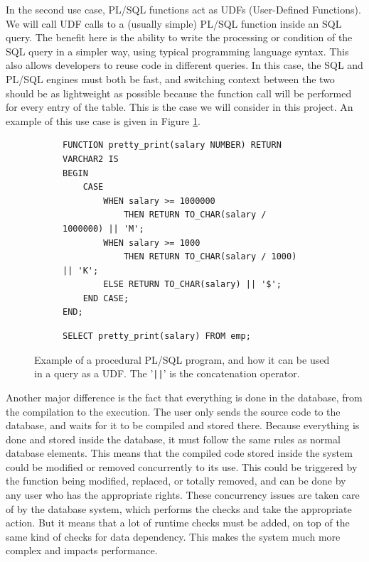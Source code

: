 \documentclass[twoside,11pt,a4paper]{article}
\newcommand{\sql}[1]{\texttt{#1}}
\begin{document}
In the second use case, PL/SQL functions act as UDFs (User-Defined Functions). We will call UDF calls to a (usually simple) PL/SQL function inside an SQL query. The benefit here is the ability to write the processing or condition of the SQL query in a simpler way, using typical programming language syntax. This also allows developers to reuse code in different queries. In this case, the SQL and PL/SQL engines must both be fast, and switching context between the two should be as lightweight as possible because the function call will be performed for every entry of the table. This is the case we will consider in this project. An example of this use case is given in Figure \ref{fig:plsudfexample}.

\begin{figure}[tb]
	\begin{subfigure}[h]{\textwidth}
		\begin{lstlisting}[style=PLSQL, frame=L]
FUNCTION pretty_print(salary NUMBER) RETURN VARCHAR2 IS
BEGIN
	CASE
		WHEN salary >= 1000000
			THEN RETURN TO_CHAR(salary / 1000000) || 'M';
		WHEN salary >= 1000
			THEN RETURN TO_CHAR(salary / 1000) || 'K';
		ELSE RETURN TO_CHAR(salary) || '$';
	END CASE;
END;
		\end{lstlisting}
	\end{subfigure}
	
	\begin{subfigure}[h]{\textwidth}
		\begin{lstlisting}[style=SQL]
SELECT pretty_print(salary) FROM emp;
		\end{lstlisting}
	\end{subfigure}
	
	\caption[Example of a procedural PL/SQL program, and how it can be used in a query as a UDF]{Example of a procedural PL/SQL program, and how it can be used in a query as a UDF. The '\sql{||}' is the concatenation operator.}
	\label{fig:plsudfexample}
\end{figure}

Another major difference is the fact that everything is done in the database, from the compilation to the execution. The user only sends the source code to the database, and waits for it to be compiled and stored there. Because everything is done and stored inside the database, it must follow the same rules as normal database elements. This means that the compiled code stored inside the system could be modified or removed concurrently to its use. This could be triggered by the function being modified, replaced, or totally removed, and can be done by any user who has the appropriate rights. These concurrency issues are taken care of by the database system, which performs the checks and take the appropriate action. But it means that a lot of runtime checks must be added, on top of the same kind of checks for data dependency. This makes the system much more complex and impacts performance.
\end{document}
